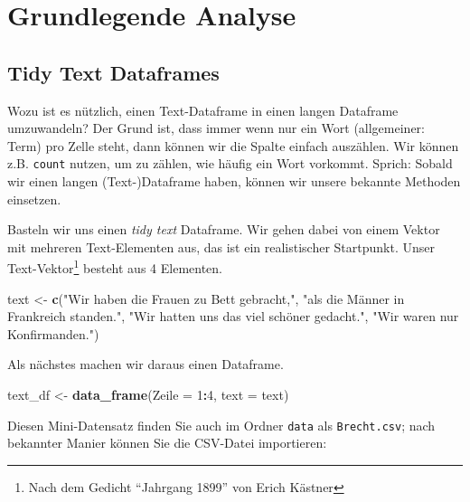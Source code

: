 \documentclass[12pt,ngerman,]{book}
\makeatletter
\newenvironment{Shaded}{\begin{snugshade}}{\end{snugshade}}
\newcommand{\KeywordTok}[1]{\textcolor[rgb]{0.13,0.29,0.53}{\textbf{#1}}}
\newcommand{\DataTypeTok}[1]{\textcolor[rgb]{0.13,0.29,0.53}{#1}}
\newcommand{\DecValTok}[1]{\textcolor[rgb]{0.00,0.00,0.81}{#1}}
\newcommand{\StringTok}[1]{\textcolor[rgb]{0.31,0.60,0.02}{#1}}
\newcommand{\OperatorTok}[1]{\textcolor[rgb]{0.81,0.36,0.00}{\textbf{#1}}}
\newcommand{\NormalTok}[1]{#1}
\let\rmarkdownfootnote\footnote%
\def\footnote{\protect\rmarkdownfootnote}
\newenvironment{kframe}{%
\medskip{}
\setlength{\fboxsep}{.8em}
 \def\at@end@of@kframe{}%
 \ifinner\ifhmode%
  \def\at@end@of@kframe{\end{minipage}}%
  \begin{minipage}{\columnwidth}%
 \fi\fi%
 \def\FrameCommand##1{\hskip\@totalleftmargin \hskip-\fboxsep
 \colorbox{shadecolor}{##1}\hskip-\fboxsep
     \hskip-\linewidth \hskip-\@totalleftmargin \hskip\columnwidth}%
 \MakeFramed {\advance\hsize-\width
   \@totalleftmargin\z@ \linewidth\hsize
   \@setminipage}}%
 {\par\unskip\endMakeFramed%
 \at@end@of@kframe}
\renewenvironment{Shaded}{\begin{kframe}}{\end{kframe}}
\theoremstyle{definition}
\theoremstyle{definition}
\theoremstyle{remark}
\makeatother
\begin{document}
\section{Grundlegende Analyse}\label{grundlegende-analyse}

\subsection{Tidy Text Dataframes}\label{tidy-text-dataframes}

Wozu ist es nützlich, einen Text-Dataframe in einen langen Dataframe
umzuwandeln? Der Grund ist, dass immer wenn nur ein Wort (allgemeiner:
Term) pro Zelle steht, dann können wir die Spalte einfach auszählen. Wir
können z.B. \texttt{count} nutzen, um zu zählen, wie häufig ein Wort
vorkommt. Sprich: Sobald wir einen langen (Text-)Dataframe haben, können
wir unsere bekannte Methoden einsetzen.

Basteln wir uns einen \emph{tidy text} Dataframe. Wir gehen dabei von
einem Vektor mit mehreren Text-Elementen aus, das ist ein realistischer
Startpunkt. Unser Text-Vektor\footnote{Nach dem Gedicht ``Jahrgang
  1899'' von Erich Kästner} besteht aus 4 Elementen.

\begin{Shaded}
\begin{Highlighting}[]
\NormalTok{text <-}\StringTok{ }\KeywordTok{c}\NormalTok{(}\StringTok{"Wir haben die Frauen zu Bett gebracht,"}\NormalTok{,}
          \StringTok{"als die Männer in Frankreich standen."}\NormalTok{,}
          \StringTok{"Wir hatten uns das viel schöner gedacht."}\NormalTok{,}
          \StringTok{"Wir waren nur Konfirmanden."}\NormalTok{)}
\end{Highlighting}
\end{Shaded}

Als nächstes machen wir daraus einen Dataframe.

\begin{Shaded}
\begin{Highlighting}[]
\NormalTok{text_df <-}\StringTok{ }\KeywordTok{data_frame}\NormalTok{(}\DataTypeTok{Zeile =} \DecValTok{1}\OperatorTok{:}\DecValTok{4}\NormalTok{,}
                      \DataTypeTok{text =}\NormalTok{ text)}
\end{Highlighting}
\end{Shaded}

Diesen Mini-Datensatz finden Sie auch im Ordner \texttt{data} als
\texttt{Brecht.csv}; nach bekannter Manier können Sie die CSV-Datei
importieren:
\end{document}
